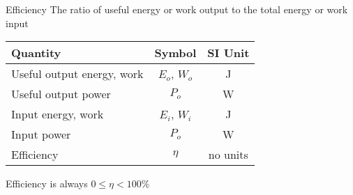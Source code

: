 \documentclass[12pt,compress,aspectratio=169]{beamer}
\begin{document}
\begin{frame}{Efficiency}
  The ratio of useful energy or work output to the total energy or work input

  \begin{center}
    \begin{tabular}{l|c|c}
      \rowcolor{pink}
      \textbf{Quantity} & \textbf{Symbol} & \textbf{SI Unit} \\ \hline
      Useful output energy, work & $E_o$, $W_o$ & \si\joule \\
      Useful output power & $P_o$ & \si\watt \\
      Input energy, work  & $E_i$, $W_i$ & \si\joule \\
      Input power & $P_o$ & \si\watt \\
      Efficiency & $\eta$ & no units
    \end{tabular}
  \end{center}
  Efficiency is always $0 \leq\eta < 100\%$
\end{frame}
\end{document}
